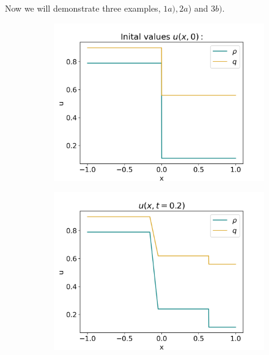 \documentclass[10pt]{article}
\numberwithin{equation}{section}
\begin{document}
Now we will demonstrate three examples, $1a), 2a$) and $3b)$. 
\begin{figure}[H]
     \centering
     \begin{subfigure}[t]{0.35\textwidth}
         \centering
         \includegraphics[width=\textwidth]{Figures/Model/Sys1aIV.png}
     \end{subfigure}
     \begin{subfigure}[t]{0.35\textwidth}
         \centering
         \includegraphics[width=\textwidth]{Figures/Model/Sys1aAtTime.png}
     \end{subfigure}
     \hfill
     \begin{subfigure}[b]{0.35\textwidth}
         \centering

\end{subfigure}
\end{figure}
\end{document}
